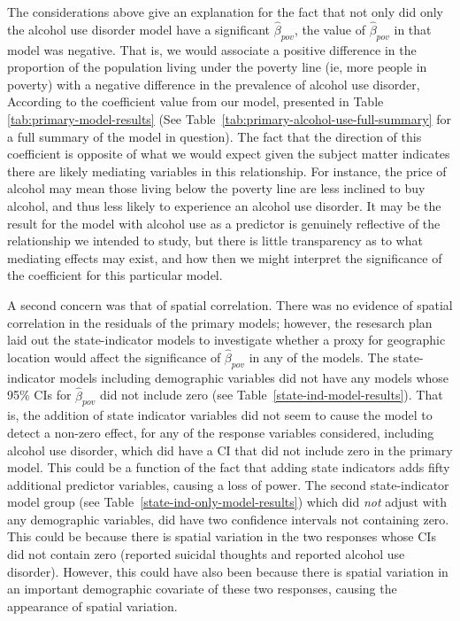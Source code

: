 \documentclass{article}
\begin{document}
The considerations above give an explanation for the fact that
not only did only the alcohol use disorder model have a
significant $\hat{\beta}_{pov}$, the value of $\hat{\beta}_{pov}$
in that model was negative.
That is, we would associate a positive difference in
the proportion of the population living under the poverty line
(ie, more people in poverty)
with a negative difference in the prevalence of alcohol use disorder,
According to the coefficient value from our model, presented in
Table \ref{tab:primary-model-results}
(See Table~\ref{tab:primary-alcohol-use-full-summary} for a full
summary of the model in question).
The fact that the direction of this coefficient is opposite of
what we would expect given the subject matter
indicates there are likely mediating variables in this relationship.
For instance, the price of alcohol may mean those living below
the poverty line are less inclined to buy alcohol,
and thus less likely to experience an alcohol use disorder.
It may be the result for the model with alcohol use as
a predictor is genuinely reflective of the relationship
we intended to study, but there is little transparency
as to what mediating effects may exist,
and how then we might interpret the significance of
the coefficient for this particular model.

A second concern was that of spatial correlation.
There was no evidence of spatial correlation in the residuals
of the primary models;
however, the resesarch plan laid out the state-indicator
models to investigate whether a proxy for geographic
location would affect the significance of
$\hat{\beta}_{pov}$
in any of the models.
The state-indicator models including demographic variables
did not have any models whose 95\% CIs for
$\hat{\beta}_{pov}$
did not include zero
(see Table~\ref{state-ind-model-results}).
That is, the addition of state indicator variables did
not seem to cause the model to detect a non-zero effect,
for any of the response variables considered,
including alcohol use disorder, which did have a
CI that did not include zero in the primary model.
This could be a function of the fact that adding
state indicators adds fifty additional predictor
variables, causing a loss of power.
The second state-indicator model group
(see Table~\ref{state-ind-only-model-results})
which did \textit{not} adjust with any demographic variables,
did have two confidence intervals not containing zero.
This could be because there is spatial variation
in the two responses whose CIs did not contain zero
(reported suicidal thoughts and reported alcohol use disorder).
However, this could have also been because there is
spatial variation in an important demographic covariate of
these two responses, causing the appearance of spatial variation.
\end{document}

